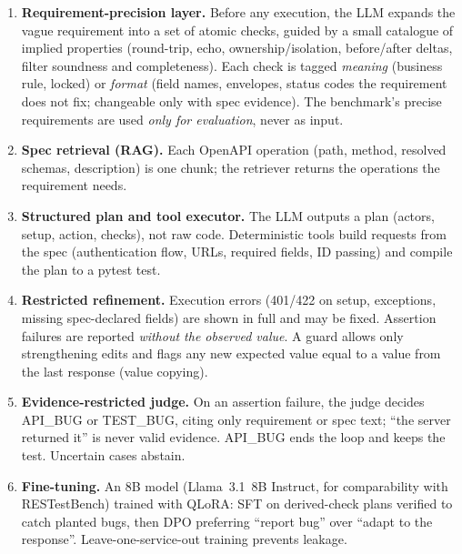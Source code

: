 \documentclass[11pt,a4paper]{article}
\begin{document}
\begin{enumerate}[label=(\arabic*)]
\item \textbf{Requirement-precision layer.} Before any execution, the LLM expands the vague requirement into a set of atomic checks, guided by a small catalogue of implied properties (round-trip, echo, ownership/isolation, before/after deltas, filter soundness and completeness). Each check is tagged \emph{meaning} (business rule, locked) or \emph{format} (field names, envelopes, status codes the requirement does not fix; changeable only with spec evidence). The benchmark's precise requirements are used \emph{only for evaluation}, never as input.
\item \textbf{Spec retrieval (RAG).} Each OpenAPI operation (path, method, resolved schemas, description) is one chunk; the retriever returns the operations the requirement needs.
\item \textbf{Structured plan and tool executor.} The LLM outputs a plan (actors, setup, action, checks), not raw code. Deterministic tools build requests from the spec (authentication flow, URLs, required fields, ID passing) and compile the plan to a pytest test.
\item \textbf{Restricted refinement.} Execution errors (401/422 on setup, exceptions, missing spec-declared fields) are shown in full and may be fixed. Assertion failures are reported \emph{without the observed value}. A guard allows only strengthening edits and flags any new expected value equal to a value from the last response (value copying).
\item \textbf{Evidence-restricted judge.} On an assertion failure, the judge decides \textsc{API\_BUG} or \textsc{TEST\_BUG}, citing only requirement or spec text; ``the server returned it'' is never valid evidence. \textsc{API\_BUG} ends the loop and keeps the test. Uncertain cases abstain.
\item \textbf{Fine-tuning.} An 8B model (Llama~3.1~8B Instruct, for comparability with RESTestBench) trained with QLoRA: SFT on derived-check plans verified to catch planted bugs, then DPO preferring ``report bug'' over ``adapt to the response''. Leave-one-service-out training prevents leakage.
\end{enumerate}

\end{document}
